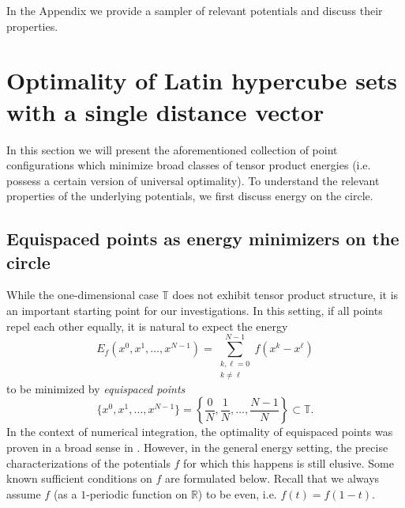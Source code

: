\documentclass[a4paper,12pt]{article}
\numberwithin{equation}{section}
\theoremstyle{definition}
\newcommand{\bbT}{\mathbb{T}}
\begin{document}
In the Appendix we provide a sampler  of  relevant potentials and discuss their properties. 


\section{Optimality of Latin hypercube sets with a single   distance vector}\label{s.1dist}

In this section  we will present the aforementioned   collection of point configurations which minimize broad classes of tensor product energies (i.e. possess a certain version of universal optimality). To understand the relevant properties of the underlying potentials, we first discuss energy on the circle.

\subsection{Equispaced points as energy minimizers on the circle}\label{sec:equispaced}


While the one-dimensional case $\bbT$ does not exhibit tensor product structure, it is an important starting point for our investigations. In this setting, if all points repel each other equally, it is natural to expect the energy  $$ E_f(x^0, x^1, \dots, x^{N-1}) =  \sum_{\substack{k, \ell=0 \\ k \neq \ell}}^{N-1}f ({{x}}^k -  {{x}}^\ell)$$ to be minimized by \emph{equispaced points}
$$
\{ {{x}}^0, {{x}}^1,\dots, {{x}}^{N-1} \} = \left\{\frac0N, \frac1N, \dots, \frac{N-1}N\right\} \subset \bbT.
$$
In the context of numerical integration, the optimality of equispaced points was proven in a broad sense in \cite{Zen77}. However, in the general energy setting, the precise characterizations of  the potentials $f$ for which this happens is still elusive. Some known sufficient conditions on $f$  are formulated below. %
Recall that we always assume $f$  (as a $1$-periodic function on $\mathbb R$) to be even, i.e. $f(t) = f(1-t)$.%
\end{document}
